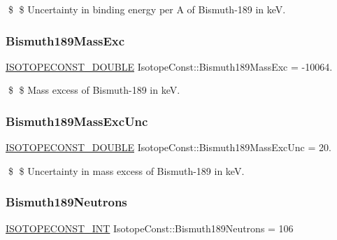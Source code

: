 \$ \$ Uncertainty in binding energy per A of Bismuth-\/189 in keV. \mbox{\label{group___isotope_const-_bismuth-_bi189_ga8c467cdbdea93ebc39ff68abc6e2e0ba}} 
\subsubsection{\texorpdfstring{Bismuth189\+Mass\+Exc}{Bismuth189MassExc}}
{\footnotesize\ttfamily \mbox{\hyperlink{group___isotope_const-_macros_ga8f45a7272ce02c0b4c65c44636ed719a}{I\+S\+O\+T\+O\+P\+E\+C\+O\+N\+S\+T\+\_\+\+D\+O\+U\+B\+LE}} Isotope\+Const\+::\+Bismuth189\+Mass\+Exc = -\/10064.}

\$ \$ Mass excess of Bismuth-\/189 in keV. \mbox{\label{group___isotope_const-_bismuth-_bi189_ga10b5c0f858bcc09a9098b786bf5c169a}} 
\subsubsection{\texorpdfstring{Bismuth189\+Mass\+Exc\+Unc}{Bismuth189MassExcUnc}}
{\footnotesize\ttfamily \mbox{\hyperlink{group___isotope_const-_macros_ga8f45a7272ce02c0b4c65c44636ed719a}{I\+S\+O\+T\+O\+P\+E\+C\+O\+N\+S\+T\+\_\+\+D\+O\+U\+B\+LE}} Isotope\+Const\+::\+Bismuth189\+Mass\+Exc\+Unc = 20.}

\$ \$ Uncertainty in mass excess of Bismuth-\/189 in keV. \mbox{\label{group___isotope_const-_bismuth-_bi189_gaa96f26e9efb470e65df231719fceb9fa}} 
\subsubsection{\texorpdfstring{Bismuth189\+Neutrons}{Bismuth189Neutrons}}
{\footnotesize\ttfamily \mbox{\hyperlink{group___isotope_const-_macros_ga5f18360b3e99483a35c32d789e62621c}{I\+S\+O\+T\+O\+P\+E\+C\+O\+N\+S\+T\+\_\+\+I\+NT}} Isotope\+Const\+::\+Bismuth189\+Neutrons = 106}

